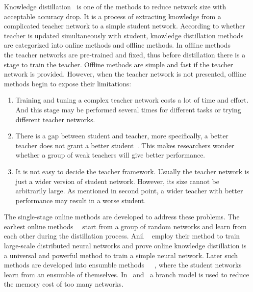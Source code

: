 \documentclass[10pt,twocolumn,letterpaper]{article}
\begin{document}
Knowledge distillation~\cite{hinton2015distilling} is one of the methods to reduce
network size with acceptable accuracy drop. It is a process of extracting knowledge
from a complicated teacher network to a simple student network. According to whether teacher is updated simultaneously with student, knowledge distillation methods
are categorized into online methods and offline methods. In offline methods~\cite{liu2019knowledge}~\cite{mirzadeh2020improved}~\cite{passalis2020heterogeneous}~\cite{romero2014fitnets} the teacher networks
are pre-trained and fixed, thus before distillation there is a stage to train the teacher.
Offline methods are simple and fast if the teacher network is provided. However, when the teacher network is not presented,
offline methods begin to expose their limitations:
\begin{enumerate}
   \item Training and tuning a complex teacher network costs a lot of time and effort. And this stage may be performed several times for different tasks or trying different teacher networks.
   \item There is a gap between student and teacher, more specifically, a better teacher does not grant a better student~\cite{mirzadeh2020improved}. This makes researchers wonder whether a group of weak teachers will give better performance.
   \item It is not easy to decide the teacher framework. Usually the teacher network is just a wider version of student network. However, its size cannot be arbitrarily large. As mentioned in second point,
   a wider teacher with better performance may result in a worse student.
 \end{enumerate}

The single-stage online methods are developed to address these problems.
The earliest online methods~\cite{anil2018large}~\cite{zhang2018deep} start from a group of random networks and 
learn from each other during the distillation process. Anil \etal~\cite{anil2018large} employ their method to train
large-scale distributed neural networks and prove online knowledge distillation is a universal and powerful method
to train a simple neural network. Later such methods are developed into ensumble methods~\cite{chen2020online}~\cite{guo2020online}~\cite{lan2018knowledge}, where the student networks learn
from an ensumble of themselves. In~\cite{lan2018knowledge} and~\cite{song2018collaborative} a branch model is used to reduce the memory cost of too many networks.
\end{document}
